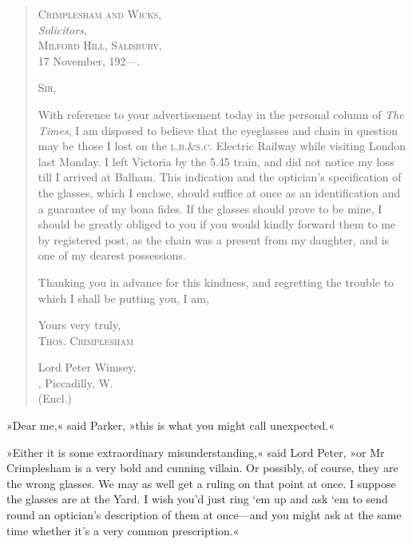 \begin{quotation}
\begin{flushright}
\hfill
\begin{minipage}{0.5\linewidth}
\textsc{Crimplesham and Wicks,}\\
\vin \textit{Solicitors,}\\
\textsc{Milford Hill, Salisbury,}\\
17 November, 192---.
\end{minipage}
\end{flushright}

\noindent \textsc{Sir,}

With reference to your advertisement today in the personal column of \textit{The Times}, I am disposed to believe that the eyeglasses and chain in question may be those I lost on the \textsc{l.b.\&s.c.} Electric Railway while visiting London last Monday. I left Victoria by the 5.45 train, and did not notice my loss till I arrived at Balham. This indication and the optician's specification of the glasses, which I enclose, should suffice at once as an identification and a guarantee of my bona fides. If the glasses should prove to be mine, I should be greatly obliged to you if you would kindly forward them to me by registered post, as the chain was a present from my daughter, and is one of my dearest possessions.

Thanking you in advance for this kindness, and regretting the trouble to which I shall be putting you, I am,

\begin{flushright}
Yours very truly,\\
\textsc{Thos. Crimplesham}\\
\end{flushright}

\noindent Lord Peter Wimsey,\\
, Piccadilly, W.\\
\noindent (Encl.)
\end{quotation}

»Dear me,« said Parker, »this is what you might call unexpected.«

»Either it is some extraordinary misunderstanding,« said Lord Peter, »or Mr Crimplesham is a very bold and cunning villain. Or possibly, of course, they are the wrong glasses. We may as well get a ruling on that point at once. I suppose the glasses are at the Yard. I wish you'd just ring `em up and ask `em to send round an optician's description of them at once—and you might ask at the same time whether it's a very common prescription.«


